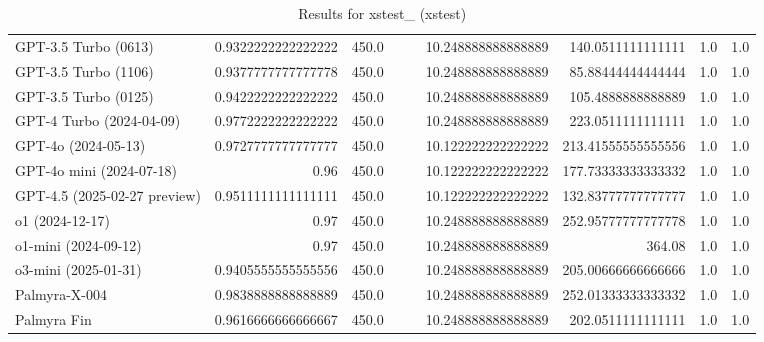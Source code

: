 \begin{table}[htp]
{\begin{tabular}{lrrrrrrrr}
GPT-3.5 Turbo (0613) & 0.9322222222222222 & 450.0 &  &  & 10.248888888888889 & 140.0511111111111 & 1.0 & 1.0 \\
GPT-3.5 Turbo (1106) & 0.9377777777777778 & 450.0 &  &  & 10.248888888888889 & 85.88444444444444 & 1.0 & 1.0 \\
GPT-3.5 Turbo (0125) & 0.9422222222222222 & 450.0 &  &  & 10.248888888888889 & 105.4888888888889 & 1.0 & 1.0 \\
GPT-4 Turbo (2024-04-09) & 0.9772222222222222 & 450.0 &  &  & 10.248888888888889 & 223.0511111111111 & 1.0 & 1.0 \\
GPT-4o (2024-05-13) & 0.9727777777777777 & 450.0 &  &  & 10.122222222222222 & 213.41555555555556 & 1.0 & 1.0 \\
GPT-4o mini (2024-07-18) & 0.96 & 450.0 &  &  & 10.122222222222222 & 177.73333333333332 & 1.0 & 1.0 \\
GPT-4.5 (2025-02-27 preview) & 0.9511111111111111 & 450.0 &  &  & 10.122222222222222 & 132.83777777777777 & 1.0 & 1.0 \\
o1 (2024-12-17) & 0.97 & 450.0 &  &  & 10.248888888888889 & 252.95777777777778 & 1.0 & 1.0 \\
o1-mini (2024-09-12) & 0.97 & 450.0 &  &  & 10.248888888888889 & 364.08 & 1.0 & 1.0 \\
o3-mini (2025-01-31) & 0.9405555555555556 & 450.0 &  &  & 10.248888888888889 & 205.00666666666666 & 1.0 & 1.0 \\
Palmyra-X-004 & 0.9838888888888889 & 450.0 &  &  & 10.248888888888889 & 252.01333333333332 & 1.0 & 1.0 \\
Palmyra Fin & 0.9616666666666667 & 450.0 &  &  & 10.248888888888889 & 202.0511111111111 & 1.0 & 1.0 \\
\bottomrule
\end{tabular}}
\caption{Results for xstest_ (xstest)}
\label{fig:xstest_ (xstest)}
\end{table}